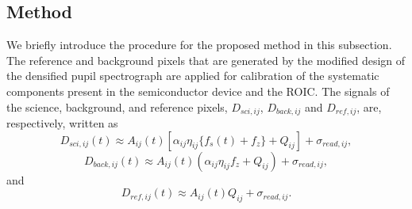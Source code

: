 \documentclass{aastex62}
\begin{document}
\subsection{Method} \label{subsec:method}

We briefly introduce the procedure for the proposed method in this subsection. The reference and background pixels that are generated by the modified design of the densified pupil spectrograph are applied for calibration of the systematic components present in the semiconductor device and the ROIC. The signals of the science, background, and reference pixels, $D_{sci,ij}$, $D_{back,ij}$ and $D_{ref,ij}$, are, respectively, written as
\begin{equation}
D_{sci,ij}(t) \approx A_{ij}(t)[\alpha_{ij}\eta_{ij}\{f_{s}(t)+f_{z}\}+Q_{ij}]+\sigma_{read,ij} ,
\end{equation}
\begin{equation}
D_{back,ij}(t) \approx A_{ij}(t)(\alpha_{ij}\eta_{ij}f_{z}+Q_{ij})+\sigma_{read,ij} ,
\end{equation}
and
\begin{equation}
D_{ref,ij}(t) \approx A_{ij}(t)Q_{ij}+\sigma_{read,ij} .
\end{equation}
\end{document}
